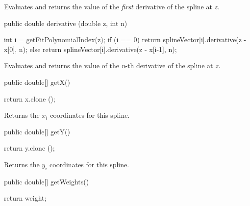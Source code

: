 \begin{tabb} Evaluates and returns the value of the \emph{first} derivative of
 the spline at $z$.
\end{tabb}
\begin{htmlonly}
\end{htmlonly}
\begin{code}

   public double derivative (double z, int n)\begin{hide}  {
      int i = getFitPolynomialIndex(z);
      if (i == 0)
         return splineVector[i].derivative(z - x[0], n);
      else
         return splineVector[i].derivative(z - x[i-1], n);
   }\end{hide}
\end{code}
\begin{tabb} Evaluates and returns the value of the \emph{n}-th derivative of
 the spline at $z$.
\end{tabb}
\begin{htmlonly}
\end{htmlonly}
\begin{code}

   public double[] getX()\begin{hide} {
      return x.clone ();
   }\end{hide}
\end{code}
\begin{tabb} Returns the $x_i$ coordinates for this spline.
\end{tabb}
\begin{htmlonly}
\end{htmlonly}
\begin{code}

   public double[] getY()\begin{hide} {
      return y.clone ();
   }\end{hide}
\end{code}
\begin{tabb}   Returns the $y_i$ coordinates for this spline.
\end{tabb}
\begin{htmlonly}
\end{htmlonly}
\begin{code}

   public double[] getWeights()\begin{hide} {
     return weight;
   }\end{hide}
\end{code}
